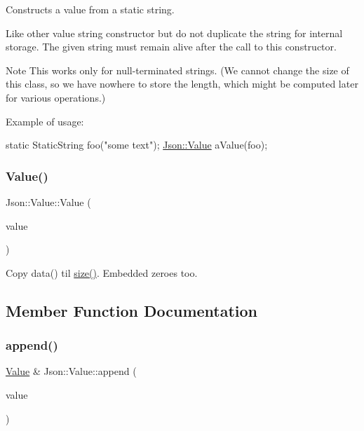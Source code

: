Constructs a value from a static string. 

Like other value string constructor but do not duplicate the string for internal storage. The given string must remain alive after the call to this constructor. \begin{DoxyNote}{Note}
This works only for null-\/terminated strings. (We cannot change the size of this class, so we have nowhere to store the length, which might be computed later for various operations.)
\end{DoxyNote}
Example of usage\+: 
\begin{DoxyCode}
\textcolor{keyword}{static} StaticString foo(\textcolor{stringliteral}{"some text"});
\hyperlink{classJson_1_1Value}{Json::Value} aValue(foo);
\end{DoxyCode}
 \mbox{\label{classJson_1_1Value_a89ef37969ff7c6eb3a7afcca03d4cd4a}} 
\subsubsection{\texorpdfstring{Value()}{Value()}\hspace{0.1cm}{\footnotesize\ttfamily [3/3]}}
{\footnotesize\ttfamily Json\+::\+Value\+::\+Value (\begin{DoxyParamCaption}\item[{const J\+S\+O\+N\+C\+P\+P\+\_\+\+S\+T\+R\+I\+NG \&}]{value }\end{DoxyParamCaption})}

Copy data() til \hyperlink{classJson_1_1Value_a0ec2808e1d7efa4e9fad938d6667be44}{size()}. Embedded zeroes too. 

\subsection{Member Function Documentation}
\mbox{\label{classJson_1_1Value_a7e49ac977e4bcf59745a09d426669f75}} 
\subsubsection{\texorpdfstring{append()}{append()}}
{\footnotesize\ttfamily \hyperlink{classJson_1_1Value}{Value} \& Json\+::\+Value\+::append (\begin{DoxyParamCaption}\item[{const \hyperlink{classJson_1_1Value}{Value} \&}]{value }\end{DoxyParamCaption})}



